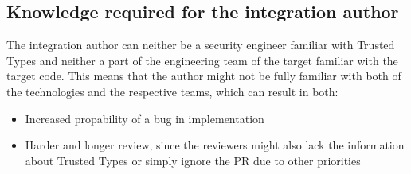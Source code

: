 \subsection{Knowledge required for the integration author}
\label{sub:trust_integration_author}

The integration author can neither be a security engineer familiar with Trusted Types and neither a
part of the engineering team of the target familiar with the target code. This means that the author
might not be fully familiar with both of the technologies and the respective teams, which can result
in both:

\begin{itemize}
  \item Increased propability of a bug in implementation
  \item Harder and longer review, since the reviewers might also lack the information about Trusted
        Types or simply ignore the PR due to other priorities
\end{itemize}
